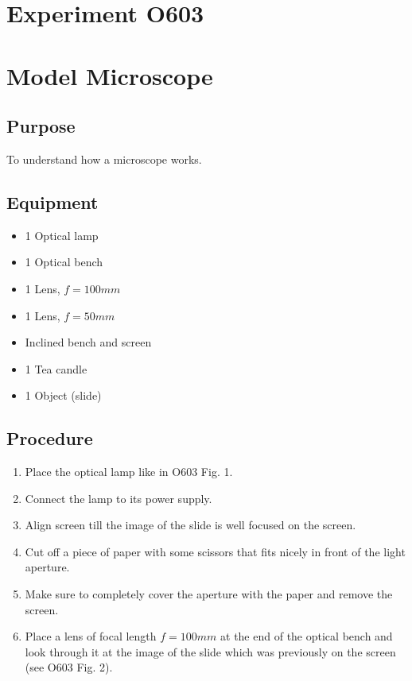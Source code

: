 \documentclass[12pt]{article}
\begin{document}
\section*{Experiment O603}

\section*{Model Microscope}

\subsection*{Purpose}

To understand how a microscope works.

\subsection*{Equipment}

\begin{itemize}
\item 1 Optical lamp
\item 1 Optical bench
\item 1 Lens, $f=100 mm$
\item 1 Lens, $f=50 mm$
\item Inclined bench and screen
\item 1 Tea candle
\item 1 Object (slide)
\end{itemize}

\subsection*{Procedure}

\begin{enumerate}
\item Place the optical lamp like in O603 Fig. 1.
\item Connect the lamp to its power supply.
\item Align screen till the image of the slide is well focused on the screen.
\item Cut off a piece of paper with some scissors that fits nicely in front of the light aperture.
\item Make sure to completely cover the aperture with the paper and remove the screen.
\item Place a lens of focal length $f=100mm$ at the end of the optical bench and look through it at the image of the slide which was previously on the screen (see O603 Fig. 2).
\end{enumerate}
\end{document}
